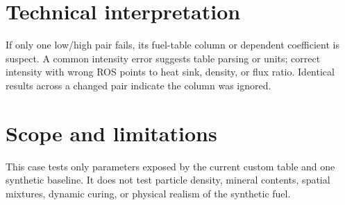 \section{Technical interpretation}
If only one low/high pair fails, its fuel-table column or dependent coefficient is suspect.  A common intensity error suggests table parsing or units; correct intensity with wrong ROS points to heat sink, density, or flux ratio.  Identical results across a changed pair indicate the column was ignored.

\section{Scope and limitations}
This case tests only parameters exposed by the current custom table and one synthetic baseline.  It does not test particle density, mineral contents, spatial mixtures, dynamic curing, or physical realism of the synthetic fuel.
